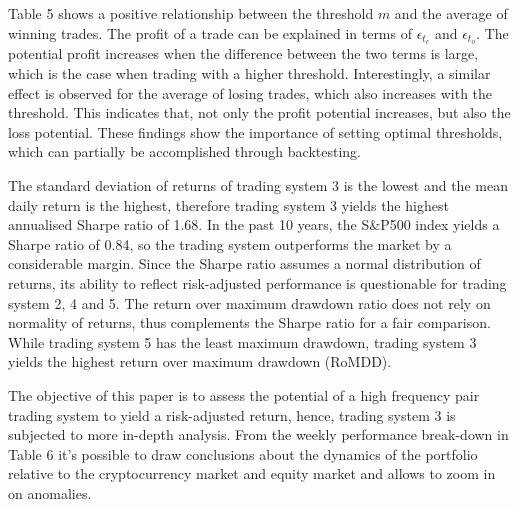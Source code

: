\documentclass[12pt,english,authoryear]{article}
\begin{document}
Table 5 shows a positive relationship between the threshold $m$ and the average of winning trades. The profit of a trade can be explained in terms of $\epsilon_{t_c}$ and $\epsilon_{t_o}$. The potential profit increases when the difference between the two terms is large, which is the case when trading with a higher threshold. Interestingly, a similar effect is observed for the average of losing trades, which also increases with the threshold. This indicates that, not only the profit potential increases, but also the loss potential. These findings show the importance of setting optimal thresholds, which can partially be accomplished through backtesting. 

The standard deviation of returns of trading system 3 is the lowest and the mean daily return is the highest, therefore trading system 3 yields the highest annualised Sharpe ratio of 1.68. In the past 10 years, the S\&P500 index yields a Sharpe ratio of 0.84, so the trading system outperforms the market by a considerable margin\footnotemark. Since the Sharpe ratio assumes a normal distribution of returns, its ability to reflect risk-adjusted performance is questionable for trading system 2, 4 and 5. The return over maximum drawdown ratio does not rely on normality of returns, thus complements the Sharpe ratio for a fair comparison. While trading system 5 has the least maximum drawdown, trading system 3 yields the highest return over maximum drawdown (RoMDD). 


The objective of this paper is to assess the potential of a high frequency pair trading system to yield a risk-adjusted return, hence, trading system 3 is subjected to more in-depth analysis. From the weekly performance break-down in Table 6 it's possible to draw conclusions about the dynamics of the portfolio relative to the cryptocurrency market and equity market and allows to zoom in on anomalies. 

\end{document}
